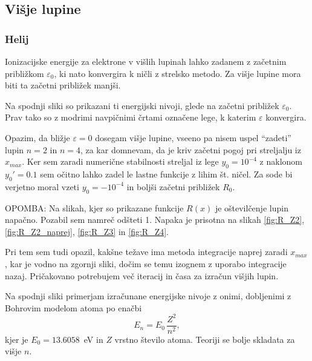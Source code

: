 \subsection{Višje lupine}
\subsubsection{Helij}

Ionizacijske energije za elektrone v višlih lupinah lahko zadanem z začetnim približkom $\varepsilon_0$, ki nato konvergira k ničli z strelsko metodo. Za višje lupine mora biti ta začetni približek manjši.

Na spodnji sliki so prikazani ti energijski nivoji, glede na začetni približek $\varepsilon_0$. Prav tako so z modrimi navpičnimi črtami označene lege, k katerim $\varepsilon$ konvergira.


Opazim, da bližje $\varepsilon=0$ dosegam višje lupine, vseeno pa nisem uspel ``zadeti'' lupin $n=2$ in $n=4$, za kar domnevam, da je kriv začetni pogoj pri streljalju iz $x_{max}$. Ker sem zaradi numerične stabilnosti streljal iz lege $y_0=10^{-4}$ z naklonom $y_0'=0.1$ sem očitno lahko zadel le lastne funkcije z lihim št. ničel. Za sode bi verjetno moral vzeti $y_0=-10^{-4}$ in boljši začetni približek $R_0$.

\vspace{5mm}
OPOMBA: Na slikah, kjer so prikazane funkcije $R(x)$ je oštevilčenje lupin napačno. Pozabil sem namreč odšteti 1. Napaka je prisotna na slikah \ref{fig:R_Z2}, \ref{fig:R_Z2_naprej}, \ref{fig:R_Z3} in \ref{fig:R_Z4}.


Pri tem sem tudi opazil, kakšne težave ima metoda integracije naprej zaradi $x_{max}$, kar je vodno na zgornji sliki, dočim se temu izognem z uporabo integracije nazaj. Pričakovano potrebujem več iteracij in časa za izračun višjih lupin.


Na spodnji sliki primerjam izračunane energijske nivoje z onimi, dobljenimi z Bohrovim modelom atoma po enačbi
\begin{equation}
    E_n = E_0\,\frac{Z^2}{n^2},
\end{equation}
kjer je $E_0=13.6058$~eV in $Z$ vrstno število atoma. Teoriji se bolje skladata za višje $n$.

